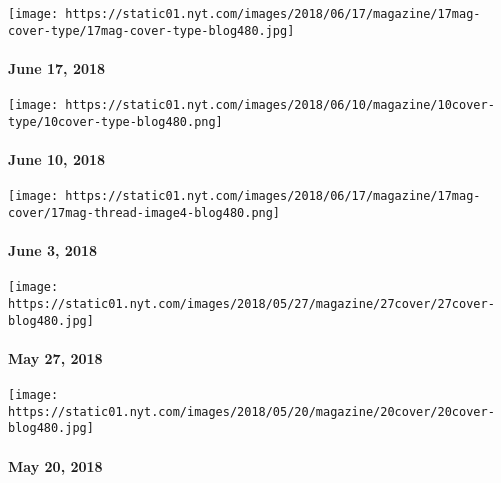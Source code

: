 \href{https://www.nytimes.com/issue/magazine/2018/06/14/61718-issue}{}

\texttt{[image: https://static01.nyt.com/images/2018/06/17/magazine/17mag-cover-type/17mag-cover-type-blog480.jpg]}

\hypertarget{june-17-2018}{%
\paragraph{June 17, 2018}\label{june-17-2018}}

\href{https://www.nytimes.com/interactive/2018/06/07/magazine/new-york-love-city.html}{}

\texttt{[image: https://static01.nyt.com/images/2018/06/10/magazine/10cover-type/10cover-type-blog480.png]}

\hypertarget{june-10-2018}{%
\paragraph{June 10, 2018}\label{june-10-2018}}

\href{https://www.nytimes.com/issue/magazine/2018/06/13/6318-issue}{}

\texttt{[image: https://static01.nyt.com/images/2018/06/17/magazine/17mag-cover/17mag-thread-image4-blog480.png]}

\hypertarget{june-3-2018}{%
\paragraph{June 3, 2018}\label{june-3-2018}}

\href{https://www.nytimes.com/issue/magazine/2018/05/25/052718-issue}{}

\texttt{[image: https://static01.nyt.com/images/2018/05/27/magazine/27cover/27cover-blog480.jpg]}

\hypertarget{may-27-2018}{%
\paragraph{May 27, 2018}\label{may-27-2018}}

\href{https://www.nytimes.com/issue/magazine/2018/05/25/052018-issue}{}

\texttt{[image: https://static01.nyt.com/images/2018/05/20/magazine/20cover/20cover-blog480.jpg]}

\hypertarget{may-20-2018}{%
\paragraph{May 20, 2018}\label{may-20-2018}}

